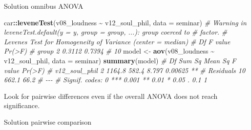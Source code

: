 \documentclass[
]{book}
\newenvironment{Shaded}{\begin{snugshade}}{\end{snugshade}}
\newcommand{\AttributeTok}[1]{\textcolor[rgb]{0.13,0.29,0.53}{#1}}
\newcommand{\CommentTok}[1]{\textcolor[rgb]{0.56,0.35,0.01}{\textit{#1}}}
\newcommand{\FunctionTok}[1]{\textcolor[rgb]{0.13,0.29,0.53}{\textbf{#1}}}
\newcommand{\NormalTok}[1]{#1}
\newcommand{\OtherTok}[1]{\textcolor[rgb]{0.56,0.35,0.01}{#1}}
\newcommand{\SpecialCharTok}[1]{\textcolor[rgb]{0.81,0.36,0.00}{\textbf{#1}}}
\begin{document}
Solution omnibus ANOVA

\begin{Shaded}
\begin{Highlighting}[]
\NormalTok{car}\SpecialCharTok{::}\FunctionTok{leveneTest}\NormalTok{(v08\_loudness }\SpecialCharTok{\textasciitilde{}}\NormalTok{ v12\_soul\_phil, }\AttributeTok{data =}\NormalTok{ seminar)}
\CommentTok{\# Warning in leveneTest.default(y = y, group = group, ...): group coerced to}
\CommentTok{\# factor.}
\CommentTok{\# Levene\textquotesingle{}s Test for Homogeneity of Variance (center = median)}
\CommentTok{\#       Df F value Pr(\textgreater{}F)}
\CommentTok{\# group  2  0.3112 0.7394}
\CommentTok{\#       10}
\NormalTok{model }\OtherTok{\textless{}{-}} \FunctionTok{aov}\NormalTok{(v08\_loudness }\SpecialCharTok{\textasciitilde{}}\NormalTok{ v12\_soul\_phil, }\AttributeTok{data =}\NormalTok{ seminar)}
\FunctionTok{summary}\NormalTok{(model)}
\CommentTok{\#               Df Sum Sq Mean Sq F value  Pr(\textgreater{}F)   }
\CommentTok{\# v12\_soul\_phil  2 1164.8   582.4   8.797 0.00625 **}
\CommentTok{\# Residuals     10  662.1    66.2                   }
\CommentTok{\# {-}{-}{-}}
\CommentTok{\# Signif. codes:  0 \textquotesingle{}***\textquotesingle{} 0.001 \textquotesingle{}**\textquotesingle{} 0.01 \textquotesingle{}*\textquotesingle{} 0.05 \textquotesingle{}.\textquotesingle{} 0.1 \textquotesingle{} \textquotesingle{} 1}
\end{Highlighting}
\end{Shaded}

Look for pairwise differences even if the overall ANOVA does not reach significance.

Solution pairwise comparison

\begin{Shaded}
\end{Shaded}
\end{document}
